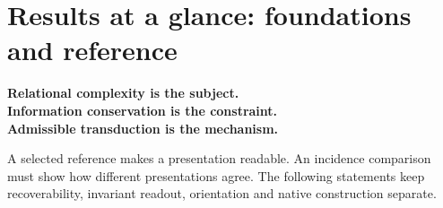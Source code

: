 \section*{Results at a glance: foundations and reference}
\begin{principle}
\centering
\textbf{Relational complexity is the subject.}\\
\textbf{Information conservation is the constraint.}\\
\textbf{Admissible transduction is the mechanism.}
\end{principle}
\noindent A selected reference makes a presentation readable. An incidence comparison must show how different presentations agree. The following statements keep recoverability, invariant readout, orientation and native construction separate.

\smallskip\small
